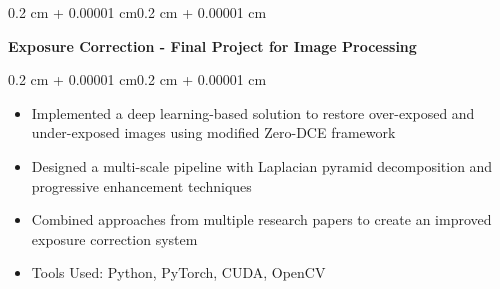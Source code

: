 \documentclass[10pt, letterpaper]{article}
\newenvironment{highlights}{
    \begin{itemize}[
        topsep=0.05 cm,
        parsep=0.05 cm,
        partopsep=0pt,
        itemsep=0pt,
        leftmargin=0.4 cm + 10pt
    ]
}{
    \end{itemize}
}
\newenvironment{onecolentry}{
    \begin{adjustwidth}{0.2 cm + 0.00001 cm}{0.2 cm + 0.00001 cm}
}{
    \end{adjustwidth}
}
\newenvironment{twocolentry}[2][]{
    \onecolentry
    \def\secondColumn{#2}
    \setcolumnwidth{\fill, 4.5 cm}
    \begin{paracol}{2}
}{
    \switchcolumn \raggedleft \secondColumn
    \end{paracol}
    \endonecolentry
}
\let\hrefWithoutArrow\href
\renewcommand{\href}[2]{\hrefWithoutArrow{#1}{\ifthenelse{\equal{#2}{}}{ }{#2 }\raisebox{.15ex}{\footnotesize \faExternalLink*}}}
\begin{document}
        
        \vspace{0.10 cm}
        \begin{twocolentry}{
        \textit{\href{https://github.com/ChuEating1005/Exposure-Correction}{Link}}}
            \textbf{Exposure Correction - Final Project for Image Processing} 
        \end{twocolentry}
        \vspace{0.05 cm}
        \begin{onecolentry}
            \begin{highlights}
                \item Implemented a deep learning-based solution to restore over-exposed and under-exposed images using modified Zero-DCE framework
                \item Designed a multi-scale pipeline with Laplacian pyramid decomposition and progressive enhancement techniques
                \item Combined approaches from multiple research papers to create an improved exposure correction system
                \item Tools Used: Python, PyTorch, CUDA, OpenCV
            \end{highlights}
        \end{onecolentry}
        
\end{document}
